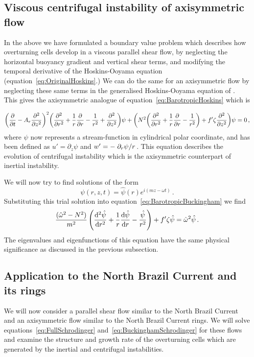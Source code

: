 \subsection{Viscous centrifugal instability of axisymmetric flow}
In the above we have formulated a boundary value problem which describes how overturning cells develop in a viscous parallel shear flow, by neglecting the horizontal buoyancy gradient and vertical shear terms, and modifying the temporal derivative of the Hoskins-Ooyama equation (equation~\ref{eq:OriginalHoskins}.) We can do the same for an axisymmetric flow by neglecting these same terms in the generalised Hoskins-Ooyama equation of \citet{Buckingham2021}. This gives the axisymmetric analogue of equation~\ref{eq:BarotropicHoskins} which is

\begin{equation}
    \label{eq:BarotropicBuckingham}
    \bigg(\pdv{}{t} - A_r \pdv[2]{}{z} \bigg)^2 \bigg(\pdv[2]{}{r} + \frac{1}{r}\pdv{}{r} - \frac{1}{r^2} + \pdv[2]{}{z} \bigg) \psi + \bigg( N^2 \bigg(\pdv[2]{}{r} + \frac{1}{r}\pdv{}{r} - \frac{1}{r^2}\bigg) + f' \zeta \pdv[2]{}{z} \bigg) \psi = 0 \, ,
\end{equation}
where $\psi$ now represents a stream-function in cylindrical polar coordinate, and has been defined as $u' = \partial_z \psi$ and $w' = - \flatfrac{\partial_r \psi}{r}$. This equation describes the evolution of centrifugal instability which is the axisymmetric counterpart of inertial instability.

We will now try to find solutions of the form
\begin{equation}
    \psi(r, z, t) = \hat{\psi}(r) e^{i(mz - \omega t)} \, .
\end{equation}
Substituting this trial solution into equation~\ref{eq:BarotropicBuckingham} we find
\begin{equation}
    \frac{(\hat{\omega}^2 - N^2 )}{m^2}\, \Bigg(\dv[2]{\hat{\psi}}{r} + \frac{1}{r} \dv{\hat{\psi}}{r} - \frac{\hat{\psi}}{r^2}\Bigg) + f' \zeta \hat{\psi} = \hat{\omega}^2 \hat{\psi}\, .
    \label{eq:BuckinghamSchrodinger}
\end{equation}
The eigenvalues and eigenfunctions of this equation have the same physical significance as discussed in the previous subsection.



\subsection{Application to the North Brazil Current and its rings}
\label{subsec:NBClsa}
We will now consider a parallel shear flow similar to the North Brazil Current and an axisymmetric flow similar to the North Brazil Current rings. We will solve equations~\ref{eq:FullSchrodinger} and~\ref{eq:BuckinghamSchrodinger} for these flows and examine the structure and growth rate of the overturning cells which are generated by the inertial and centrifugal instabilities.

